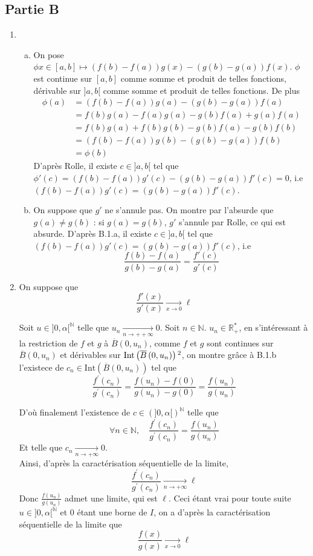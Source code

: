 \documentclass[17pt]{article}
\def\N{\mathbb N}
\def\Rpe{\mathbb R_+^*}
\begin{document}
	\subsection*{Partie B}
	\begin{enumerate}
		\item 
		\begin{enumerate}[a)]
			\item On pose $\phi x\in[a,b]\mapsto (f(b)-f(a))g(x)-(g(b)-g(a))f(x)$. $\phi$ est continue sur $[a,b]$ comme somme et produit de telles fonctions, dérivable sur $]a,b[$ comme somme et produit de telles fonctions. De plus
			\begin{align*}
				\phi(a) &=(f(b)-f(a))g(a)-(g(b)-g(a))f(a)\\
						&=f(b)g(a)-f(a)g(a)-g(b)f(a)+g(a)f(a)\\
						&=f(b)g(a)+f(b)g(b)-g(b)f(a)-g(b)f(b)\\
						&=(f(b)-f(a))g(b)-(g(b)-g(a))f(b)\\
						&=\phi(b) 
			\end{align*}
			D'après Rolle, il existe $c\in]a,b[$ tel que $\phi'(c)=(f(b)-f(a))g'(c)-(g(b)-g(a))f'(c)=0$, i.e $(f(b)-f(a))g'(c)=(g(b)-g(a))f'(c)$.
			\item On suppose que $g'$ ne s'annule pas. On montre par l'absurde que $g(a)\neq g(b)$ : si $g(a)=g(b)$, $g'$ s'annule par Rolle, ce qui est absurde. D'après B.1.a, il existe $c\in]a,b[$ tel que $(f(b)-f(a))g'(c)=(g(b)-g(a))f'(c)$, i.e \[\frac{f(b)-f(a)}{g(b)-g(a)}=\frac{f'(c)}{g'(c)}\]
		\end{enumerate}
		\item On suppose que \[\frac{f'(x)}{g'(x)}\xrightarrow[x\rightarrow 0]{} \ell\]

		\newpage

		Soit $u\in]0,\alpha[^\N$ telle que $u_n\xrightarrow[n\to+ +\infty]{}0$. Soit $n\in\N$. $u_n\in\Rpe$, en s'intéressant à la restriction de $f$ et $g$ à $\overline{B}\left(0, u_n\right)$, comme $f$ et $g$ sont continues sur $\overline{B}\left(0, u_n\right)$ et dérivables sur $\text{Int}\left(\overline{B}\left(0, u_n\right)\right)\footnotemark[2]$, on montre grâce à B.1.b l'existece de $c_n\in\text{Int}\left(\overline{B}\left(0, u_n\right)\right)$ tel que \[\frac{f^\prime(c_n)}{g^\prime(c_n)}=\frac{f\left(u_n\right)-f(0)}{g\left(u_n\right)-g(0)}=\frac{f\left(u_n\right)}{g\left(u_n\right)}\]		

		D'où finalement l'existence de $c\in(]0,\alpha[)^{\N}$ telle que \[\forall n\in\N,\quad \frac{f^\prime(c_n)}{g^\prime(c_n)}=\frac{f\left(u_n\right)}{g\left(u_n\right)}\]
		Et telle que $c_n\xrightarrow[n\rightarrow +\infty ]{} 0$.\footnotemark[3]\\
		Ainsi, d'après la caractérisation séquentielle de la limite, \[\frac{f^\prime(c_n)}{g^\prime(c_n)}\xrightarrow[n\rightarrow +\infty ]{} \ell\]
		Donc $\frac{f\left(u_n\right)}{g\left(u_n\right)}$ admet une limite, qui est $\ell$. Ceci étant vrai pour toute suite $u\in]0,\alpha[^\N$ et $0$ étant une borne de $I$, on a d'après la caractérisation séquentielle de la limite que \[\frac{f(x)}{g(x)}\xrightarrow[x\to 0]{} \ell\]
	\end{enumerate}
\end{document}
